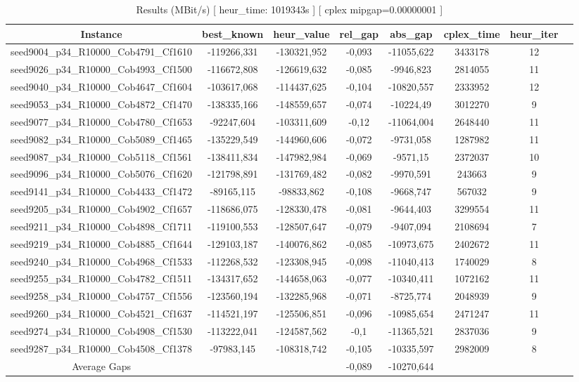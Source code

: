 \documentclass[a4paper]{article}
\begin{document}
\begin{center}
\begin{longtable}{cccccccc}
\caption{Results (MBit/s) [ heur\_time: 1019343s ]  [ cplex mipgap=0.00000001 ]}
\tabularnewline
\hline
Instance & best\_known & heur\_value & rel\_gap & abs\_gap & cplex\_time & heur\_iter\\
\hline
seed9004\_p34\_R10000\_Cob4791\_Cf1610 & -119266,331 & -130321,952 & -0,093 & -11055,622 & 3433178 & 12\\
\hline
seed9026\_p34\_R10000\_Cob4993\_Cf1500 & -116672,808 & -126619,632 & -0,085 & -9946,823 & 2814055 & 11\\
\hline
seed9040\_p34\_R10000\_Cob4647\_Cf1604 & -103617,068 & -114437,625 & -0,104 & -10820,557 & 2333952 & 12\\
\hline
seed9053\_p34\_R10000\_Cob4872\_Cf1470 & -138335,166 & -148559,657 & -0,074 & -10224,49 & 3012270 & 9\\
\hline
seed9077\_p34\_R10000\_Cob4780\_Cf1653 & -92247,604 & -103311,609 & -0,12 & -11064,004 & 2648440 & 11\\
\hline
seed9082\_p34\_R10000\_Cob5089\_Cf1465 & -135229,549 & -144960,606 & -0,072 & -9731,058 & 1287982 & 11\\
\hline
seed9087\_p34\_R10000\_Cob5118\_Cf1561 & -138411,834 & -147982,984 & -0,069 & -9571,15 & 2372037 & 10\\
\hline
seed9096\_p34\_R10000\_Cob5076\_Cf1620 & -121798,891 & -131769,482 & -0,082 & -9970,591 & 243663 & 9\\
\hline
seed9141\_p34\_R10000\_Cob4433\_Cf1472 & -89165,115 & -98833,862 & -0,108 & -9668,747 & 567032 & 9\\
\hline
seed9205\_p34\_R10000\_Cob4902\_Cf1657 & -118686,075 & -128330,478 & -0,081 & -9644,403 & 3299554 & 11\\
\hline
seed9211\_p34\_R10000\_Cob4898\_Cf1711 & -119100,553 & -128507,647 & -0,079 & -9407,094 & 2108694 & 7\\
\hline
seed9219\_p34\_R10000\_Cob4885\_Cf1644 & -129103,187 & -140076,862 & -0,085 & -10973,675 & 2402672 & 11\\
\hline
seed9240\_p34\_R10000\_Cob4968\_Cf1533 & -112268,532 & -123308,945 & -0,098 & -11040,413 & 1740029 & 8\\
\hline
seed9255\_p34\_R10000\_Cob4782\_Cf1511 & -134317,652 & -144658,063 & -0,077 & -10340,411 & 1072162 & 11\\
\hline
seed9258\_p34\_R10000\_Cob4757\_Cf1556 & -123560,194 & -132285,968 & -0,071 & -8725,774 & 2048939 & 9\\
\hline
seed9260\_p34\_R10000\_Cob4521\_Cf1637 & -114521,197 & -125506,851 & -0,096 & -10985,654 & 2471247 & 11\\
\hline
seed9274\_p34\_R10000\_Cob4908\_Cf1530 & -113222,041 & -124587,562 & -0,1 & -11365,521 & 2837036 & 9\\
\hline
seed9287\_p34\_R10000\_Cob4508\_Cf1378 & -97983,145 & -108318,742 & -0,105 & -10335,597 & 2982009 & 8\\
\hline
\hline
Average Gaps & & & -0,089 & -10270,644 & & \\
\hline
\hline
\end{longtable}
\end{center}
\end{document}
